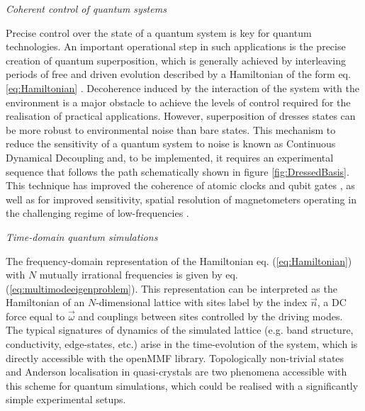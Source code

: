 \documentclass[pra,twocolumn,showkeys,preprintnumbers, amsmath,amssymb, aps,A4paper]{revtex4-1}
\begin{document}
\bigskip
\noindent
\textit{Coherent control of quantum systems}

Precise control over the state of a quantum system is key for quantum technologies. An important operational step in such applications is the precise creation of quantum superposition, which is generally achieved by interleaving periods of free and driven evolution described by a Hamiltonian of the form eq. \ref{eq:Hamiltonian} \cite{macquarrie2015continuous}.  Decoherence induced by the interaction of the system with the environment is a major obstacle to achieve the levels of control required for the realisation of practical applications. However, superposition of dresses states can be more robust to environmental noise than bare states.  This mechanism to reduce the sensitivity of a quantum system to noise is known as Continuous Dynamical Decoupling and, to be implemented, it requires an experimental sequence that follows the  path  schematically shown in figure \ref{fig:DressedBasis}. This technique has  improved the coherence of atomic clocks \cite{sarkany2014controlling,PhysRevA.97.013407} and qubit gates \cite{randall2015efficient, PhysRevLett.113.237601}, as well as for improved sensitivity, spatial resolution of magnetometers operating in the challenging regime of low-frequencies \cite{hirose2012continuous,baumgart2016ultrasensitive,yan2013rotating}. 


\bigskip
\noindent
\textit{Time-domain quantum simulations}


The frequency-domain representation of the Hamiltonian eq. (\ref{eq:Hamiltonian}) with $N$ mutually irrational frequencies is given by eq. (\ref{eq:multimodeeigenproblem}). This representation can be interpreted as the  Hamiltonian of an $N$-dimensional lattice with sites label by the index $\vec{n}$,  a DC force equal to $\vec{\omega}$ and couplings between sites controlled by the driving modes. The typical signatures of dynamics of the simulated lattice (e.g. band structure, conductivity, edge-states, etc.) arise in the time-evolution of the system, which is directly accessible with the openMMF library. Topologically non-trivial states \cite{ma2018experimental,martin2017topological} and Anderson localisation in quasi-crystals \cite{delande2017three} are two phenomena accessible with this scheme for quantum simulations, which could be realised with a significantly simple experimental setups.
\end{document}
